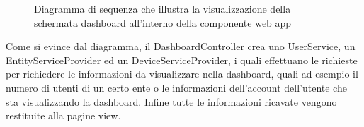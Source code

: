 \begin{landscape}
\begin{figure}[H]
			\caption{Diagramma di sequenza che illustra la visualizzazione della schermata dashboard all'interno della componente web app}
			\label{Diagramma 24}
		\end{figure}
		Come si evince dal diagramma, il DashboardController crea uno UserService, un EntityServiceProvider ed un DeviceServiceProvider, i quali effettuano le richieste  per richiedere le informazioni da visualizzare nella dashboard, quali ad esempio il numero di utenti di un certo ente o le informazioni dell'account dell'utente che sta visualizzando la dashboard. Infine tutte le informazioni ricavate vengono restituite alla pagine view.
	\end{landscape}
